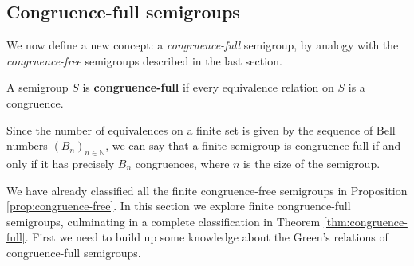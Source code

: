 \subsection{Congruence-full semigroups}
\label{sec:congruence-full}

We now define a new concept: a \textit{congruence-full} semigroup, by analogy
with the \textit{congruence-free} semigroups described in the last section.

\begin{definition}
  \label{def:congruence-full}
  A semigroup $S$ is \textbf{congruence-full} if every equivalence relation on
  $S$ is a congruence.
\end{definition}

Since the number of equivalences on a finite set is given by the sequence of
Bell numbers $(B_n)_{n \in \mathbb{N}}$, we can say that a finite semigroup is
congruence-full if and only if it has precisely $B_n$ congruences, where $n$ is
the size of the semigroup.

We have already classified all the finite congruence-free semigroups in
Proposition \ref{prop:congruence-free}.
In this section we explore finite congruence-full semigroups, culminating in a
complete classification in Theorem \ref{thm:congruence-full}.  First we need to
build up some knowledge about the Green's relations of congruence-full
semigroups.

